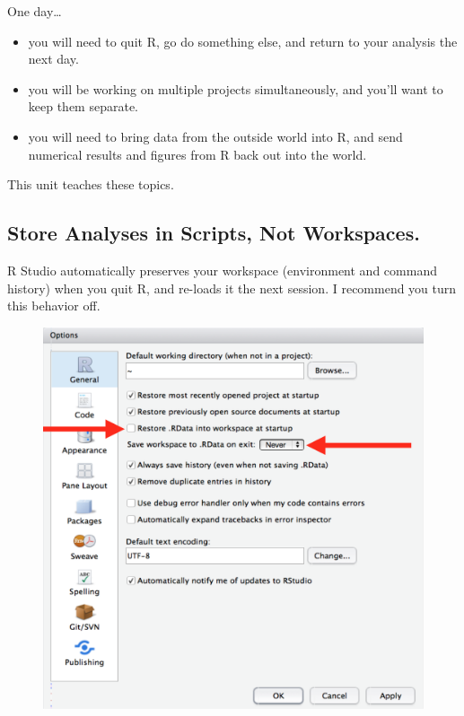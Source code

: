 \documentclass[]{book}
\providecommand{\tightlist}{%
  \setlength{\itemsep}{0pt}\setlength{\parskip}{0pt}}
\begin{document}
One day\ldots{}

\begin{itemize}
\tightlist
\item
  you will need to quit R, go do something else, and return to your
  analysis the next day.
\item
  you will be working on multiple projects simultaneously, and you'll
  want to keep them separate.
\item
  you will need to bring data from the outside world into R, and send
  numerical results and figures from R back out into the world.
\end{itemize}

This unit teaches these topics.

\subsection{Store Analyses in Scripts, Not
Workspaces.}\label{store-analyses-in-scripts-not-workspaces.}

R Studio automatically preserves your workspace (environment and command
history) when you quit R, and re-loads it the next session. I recommend
you turn this behavior off.

\begin{figure}
\centering
\includegraphics{img/rstudio-workspace.png}
\caption{}
\end{figure}
\end{document}
